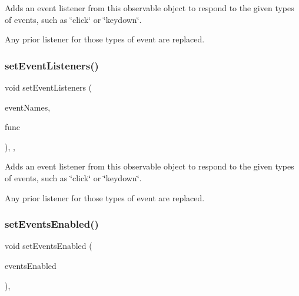 Adds an event listener from this observable object to respond to the given types of events, such as \char`\"{}click\char`\"{} or \char`\"{}keydown\char`\"{}. 

Any prior listener for those types of event are replaced. \mbox{\label{classsgl_1_1GObservable_a7867184bbb686f74fae8a4db927da799}} 
\subsubsection{\texorpdfstring{set\+Event\+Listeners()}{setEventListeners()}\hspace{0.1cm}{\footnotesize\ttfamily [2/2]}}
{\footnotesize\ttfamily void set\+Event\+Listeners (\begin{DoxyParamCaption}\item[{std\+::initializer\+\_\+list$<$ std\+::string $>$}]{event\+Names,  }\item[{\mbox{\hyperlink{namespacesgl_a54427ce97bb1c2804e4fe2b0a62e8b17}{G\+Event\+Listener\+Void}}}]{func }\end{DoxyParamCaption})\hspace{0.3cm}{\ttfamily [protected]}, {\ttfamily [virtual]}, {\ttfamily [inherited]}}



Adds an event listener from this observable object to respond to the given types of events, such as \char`\"{}click\char`\"{} or \char`\"{}keydown\char`\"{}. 

Any prior listener for those types of event are replaced. \mbox{\label{classsgl_1_1GObservable_afaa30b2a9e0f378fd1c70d2f1d0b8216}} 
\subsubsection{\texorpdfstring{set\+Events\+Enabled()}{setEventsEnabled()}}
{\footnotesize\ttfamily void set\+Events\+Enabled (\begin{DoxyParamCaption}\item[{bool}]{events\+Enabled }\end{DoxyParamCaption})\hspace{0.3cm}{\ttfamily [virtual]}, {\ttfamily [inherited]}}



